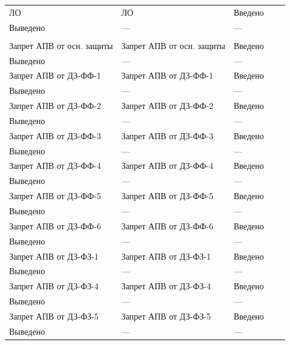 \begin{longtable}{|>{\centering\arraybackslash}m{5.3cm}|>{\centering\arraybackslash}m{3.3cm}|>{\centering\arraybackslash}m{4.2cm}|>{\centering\arraybackslash}m{1.8cm}|>{\centering\arraybackslash}m{1cm}|}
\multicolumn{5}{|c|}{ ЛО } \\ \hline 
\raggedright ЛО & \centering ЛО & \centering Введено \\ Выведено & \centering --- & \centering \arraybackslash --- \\
\hline
\multicolumn{5}{|c|}{ Запрет АПВ } \\ \hline 
\raggedright Запрет АПВ от осн. защиты & \centering Запрет АПВ от осн. защиты & \centering Введено \\ Выведено & \centering --- & \centering \arraybackslash --- \\
\hline
\raggedright Запрет АПВ от ДЗ-ФФ-1 & \centering Запрет АПВ от ДЗ-ФФ-1 & \centering Введено \\ Выведено & \centering --- & \centering \arraybackslash --- \\
\hline
\raggedright Запрет АПВ от ДЗ-ФФ-2 & \centering Запрет АПВ от ДЗ-ФФ-2 & \centering Введено \\ Выведено & \centering --- & \centering \arraybackslash --- \\
\hline
\raggedright Запрет АПВ от ДЗ-ФФ-3 & \centering Запрет АПВ от ДЗ-ФФ-3 & \centering Введено \\ Выведено & \centering --- & \centering \arraybackslash --- \\
\hline
\raggedright Запрет АПВ от ДЗ-ФФ-4 & \centering Запрет АПВ от ДЗ-ФФ-4 & \centering Введено \\ Выведено & \centering --- & \centering \arraybackslash --- \\
\hline
\raggedright Запрет АПВ от ДЗ-ФФ-5 & \centering Запрет АПВ от ДЗ-ФФ-5 & \centering Введено \\ Выведено & \centering --- & \centering \arraybackslash --- \\
\hline
\raggedright Запрет АПВ от ДЗ-ФФ-6 & \centering Запрет АПВ от ДЗ-ФФ-6 & \centering Введено \\ Выведено & \centering --- & \centering \arraybackslash --- \\
\hline
\raggedright Запрет АПВ от ДЗ-ФЗ-1 & \centering Запрет АПВ от ДЗ-ФЗ-1 & \centering Введено \\ Выведено & \centering --- & \centering \arraybackslash --- \\
\hline
\raggedright Запрет АПВ от ДЗ-ФЗ-4 & \centering Запрет АПВ от ДЗ-ФЗ-4 & \centering Введено \\ Выведено & \centering --- & \centering \arraybackslash --- \\
\hline
\raggedright Запрет АПВ от ДЗ-ФЗ-5 & \centering Запрет АПВ от ДЗ-ФЗ-5 & \centering Введено \\ Выведено & \centering --- & \centering \arraybackslash --- \\

\end{longtable}
